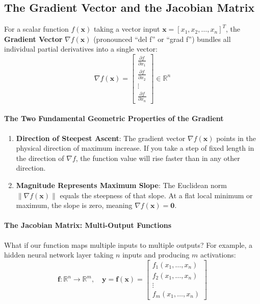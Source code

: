 \subsection{The Gradient Vector and the Jacobian Matrix}

\begin{keyidea}
For a scalar function $f(\mathbf{x})$ taking a vector input $\mathbf{x} = [x_1, x_2, \dots, x_n]^T$, the \textbf{Gradient Vector} $\nabla f(\mathbf{x})$ (pronounced ``del f'' or ``grad f'') bundles all individual partial derivatives into a single vector:
\begin{equation}
\nabla f(\mathbf{x}) = \begin{bmatrix} 
\frac{\partial f}{\partial x_1} \\[1mm] 
\frac{\partial f}{\partial x_2} \\[1mm] 
\vdots \\[1mm] 
\frac{\partial f}{\partial x_n} 
\end{bmatrix} \in \mathbb{R}^n\label{eq:gradient_vector}
\end{equation}
\end{keyidea}

\paragraph{The Two Fundamental Geometric Properties of the Gradient}
\begin{enumerate}
    \item \textbf{Direction of Steepest Ascent}: The gradient vector $\nabla f(\mathbf{x})$ points in the physical direction of maximum increase. If you take a step of fixed length in the direction of $\nabla f$, the function value will rise faster than in any other direction.
    \item \textbf{Magnitude Represents Maximum Slope}: The Euclidean norm $\|\nabla f(\mathbf{x})\|$ equals the steepness of that slope. At a flat local minimum or maximum, the slope is zero, meaning $\nabla f(\mathbf{x}) = \mathbf{0}$.
\end{enumerate}

\paragraph{The Jacobian Matrix: Multi-Output Functions}
What if our function maps multiple inputs to multiple outputs? For example, a hidden neural network layer taking $n$ inputs and producing $m$ activations:
\begin{equation*}
\mathbf{f}: \mathbb{R}^n \to \mathbb{R}^m, \quad \mathbf{y} = \mathbf{f}(\mathbf{x}) = \begin{bmatrix} f_1(x_1, \dots, x_n) \\ f_2(x_1, \dots, x_n) \\ \vdots \\ f_m(x_1, \dots, x_n) \end{bmatrix}
\end{equation*}

